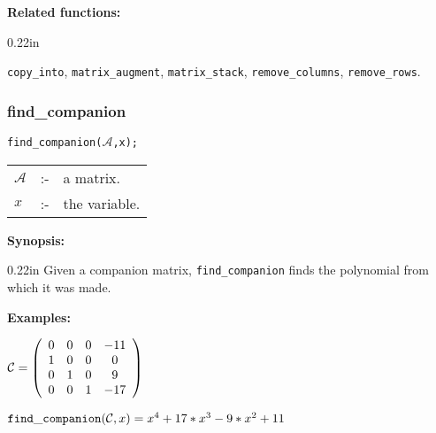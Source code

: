 {\bf Related functions:} 

\begin{addtolength}{\leftskip}{0.22in}
\parbox[t]{0.95\linewidth}{{\tt copy\_into}, {\tt matrix\_augment}, 
{\tt matrix\_stack}, {\tt remove\_columns}, {\tt remove\_rows}.}

\end{addtolength}


\subsubsection{find\_companion}
\label{linalg:find_companion}

\hspace*{0.175in} {\tt find\_companion($\mathcal{A}$,x);}

\hspace*{0.1in} 
\begin{tabular}{l l l}
$\mathcal{A}$ &:-& a matrix. \\
$x$          &:-& the variable.
\end{tabular}

{\bf Synopsis:} 

\begin{addtolength}{\leftskip}{0.22in}
  Given a companion matrix, {\tt find\_companion} finds the polynomial 
from which it was made.

\end{addtolength}


{\bf Examples:}

\begin{flushleft}
\hspace*{0.175in}
\begin{math}  
{\cal C} = \left( \begin{array}{cccc} 0 & 0 & 0 & -11 \\ 1 & 0 & 0 & 0 
\\ 0 & 1 & 0 & 9 \\ 0 & 0 & 1 & -17 
\end{array} \right)
\end{math}  
\end{flushleft}

\vspace*{3mm}

\begin{flushleft}
\hspace*{0.175in}
\begin{math}  
{\tt find\_companion}(\mathcal{C},x) = x^4+17*x^3-9*x^2+11
\end{math}  
\end{flushleft}

